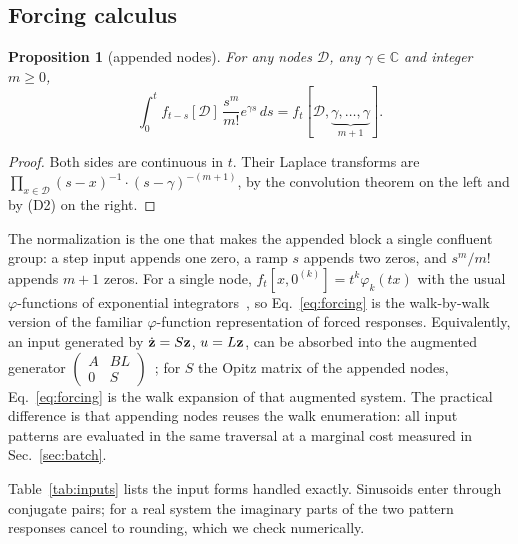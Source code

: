 \documentclass[aps,pra,superscriptaddress,floatfix,longbibliography,twocolumn]{revtex4-2}
\newcommand{\bz}{{\bf z}}
\newtheorem{proposition}{Proposition}
\begin{document}
\subsection{Forcing calculus}
\begin{proposition}[appended nodes]\label{prop:forcing}
For any nodes $\mathcal{D}$, any $\gamma\in\mathbb{C}$ and integer $m\ge0$,
\begin{equation}\label{eq:forcing}
\int_0^t f_{t-s}[\mathcal{D}]\,\frac{s^m}{m!}e^{\gamma s}\,ds=f_t[\mathcal{D},\underbrace{\gamma,\dots,\gamma}_{m+1}].
\end{equation}
\end{proposition}
\begin{proof}
Both sides are continuous in $t$. Their Laplace transforms are $\prod_{x\in\mathcal{D}}(s-x)^{-1}\cdot(s-\gamma)^{-(m+1)}$, by the convolution theorem on the left and by (D2) on the right.
\end{proof}
The normalization is the one that makes the appended block a single confluent group: a step input appends one zero, a ramp $s$ appends two zeros, and $s^m/m!$ appends $m+1$ zeros. For a single node, $f_t[x,0^{(k)}]=t^k\varphi_k(tx)$ with the usual $\varphi$-functions of exponential integrators~\cite{hochbruck2010,niesen2012}, so Eq.~\eqref{eq:forcing} is the walk-by-walk version of the familiar $\varphi$-function representation of forced responses. Equivalently, an input generated by $\dot\bz=S\bz$, $u=L\bz$, can be absorbed into the augmented generator $\left(\begin{smallmatrix}A&BL\\0&S\end{smallmatrix}\right)$~\cite{vanloan1978,almohy2011}; for $S$ the Opitz matrix of the appended nodes, Eq.~\eqref{eq:forcing} is the walk expansion of that augmented system. The practical difference is that appending nodes reuses the walk enumeration: all input patterns are evaluated in the same traversal at a marginal cost measured in Sec.~\ref{sec:batch}.

Table~\ref{tab:inputs} lists the input forms handled exactly. Sinusoids enter through conjugate pairs; for a real system the imaginary parts of the two pattern responses cancel to rounding, which we check numerically.
\end{document}
